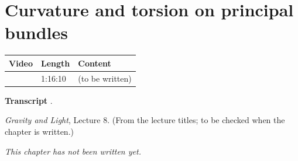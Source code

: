 \chapter{Curvature and torsion on principal bundles}\label{ch:l24}
\begin{paracol}{2}

\begin{sources}
\begin{tabularx}{\linewidth}{@{}l l L@{}}
\toprule
\textbf{Video} & \textbf{Length} & \textbf{Content}\\
\midrule
{} & 1:16:10 & (to be written)\\
\bottomrule
\end{tabularx}

\smallskip
\textbf{Transcript} .
\end{sources}

\begin{reading}
\emph{Gravity and Light}, Lecture 8. (From the lecture titles; to be checked when the chapter is written.)
\end{reading}

\emph{This chapter has not been written yet.}

\flushside
\end{paracol}
